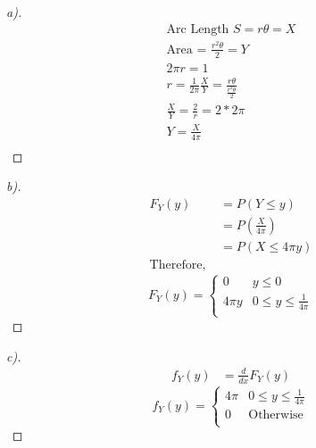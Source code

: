 \documentclass[12pt]{article}
\newenvironment{theorem}[2][Theorem]{\begin{trivlist}
\item[\hskip \labelsep {\bfseries #1}\hskip \labelsep {\bfseries #2.}]}{\end{trivlist}}
\begin{document}
\pagebreak
\begin{theorem}[Ans]{4}
\begin{proof}[a)]
\begin{align*}
\text{Arc Length }S = r\theta = X\\ 
\text{Area = }\frac{r^{2}\theta}{2} = Y\\
2\pi r = 1\\
r = \frac{1}{2\pi}
\frac{X}{Y} = \frac{r\theta}{\frac{r^{2}\theta}{2}}\\
\frac{X}{Y} = \frac{2}{r} = 2*2\pi\\
Y = \frac{X}{4\pi}\\
\end{align*}
\end{proof}

\begin{proof}[b)]
\begin{align*}
F_{Y}(y) &= P(Y\leq y)\\
&= P(\frac{X}{4\pi})\\
&= P(X\leq 4\pi y)\\
\text{Therefore, }
\end{align*}
\[  F_{Y}(y) =  \left\{
\begin{array}{ll}
      0 & y\leq 0 \\
      4\pi y & 0\leq y\leq \frac{1}{4\pi} \\
\end{array} 
\right. \]
\end{proof}

\begin{proof}[c)]
\begin{align*}
f_{Y}(y) &= \frac{d}{dx}F_{Y}(y) 
\end{align*}
\[   f_{Y}(y) =\left\{ 
\begin{array}{ll}
4\pi & 0\leq y\leq \frac{1}{4\pi} \\
      0 & \text{Otherwise}\\
\end{array} 
\right. \]
\end{proof}
\end{theorem}
\end{document}
